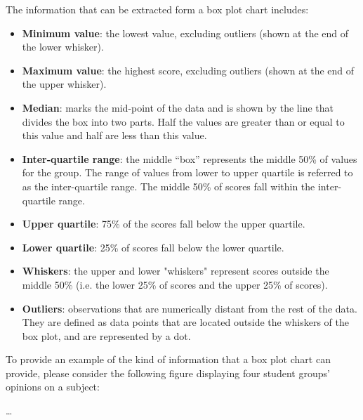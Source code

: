 The information that can be extracted form a box plot chart includes:
\begin{itemize}
    \item \textbf{Minimum value}: the lowest value, excluding outliers (shown at the end of the lower whisker).
    \item \textbf{Maximum value}: the highest score, excluding outliers (shown at the end of the upper whisker).
    \item \textbf{Median}: marks the mid-point of the data and is shown by the line that divides the box into two parts. Half the values are greater than or equal to this value and half are less than this value.
    \item \textbf{Inter-quartile range}: the middle “box” represents the middle 50\% of values for the group. The range of values from lower to upper quartile is referred to as the inter-quartile range. The middle 50\% of scores fall within the inter-quartile range.
    \item \textbf{Upper quartile}: 75\% of the scores fall below the upper quartile.
    \item \textbf{Lower quartile}: 25\% of scores fall below the lower quartile.
    \item \textbf{Whiskers}: the upper and lower "whiskers" represent scores outside the middle 50\% (i.e. the lower 25\% of scores and the upper 25\% of scores).
    \item \textbf{Outliers}: observations that are numerically distant from the rest of the data. They are defined as data points that are located outside the whiskers of the box plot, and are represented by a dot.
\end{itemize}

\noindent To provide an example of the kind of information that a box plot chart can provide, please consider the following figure displaying four student groups' opinions on a subject:

\dots

